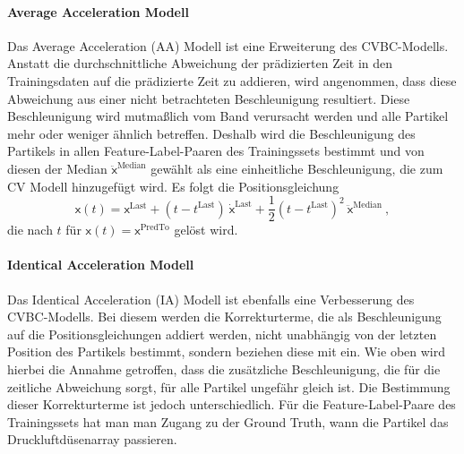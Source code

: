 \paragraph{Average Acceleration Modell}




Das Average Acceleration (AA) Modell ist eine Erweiterung des CVBC-Modells.
Anstatt die durchschnittliche Abweichung der prädizierten Zeit in den Trainingsdaten auf die prädizierte Zeit zu addieren, wird angenommen, 
dass diese Abweichung aus einer nicht betrachteten Beschleunigung resultiert.
Diese Beschleunigung wird mutmaßlich vom Band verursacht werden und alle Partikel mehr oder weniger ähnlich betreffen.
Deshalb wird die Beschleunigung des Partikels in allen Feature-Label-Paaren des Trainingssets bestimmt
und von diesen der Median \(\ddot{ \mathsf{x}}^{\text{Median}}\) gewählt als eine einheitliche Beschleunigung, die zum CV Modell hinzugefügt wird.
Es folgt die Positionsgleichung
\begin{equation*}
    \mathsf{x}(t) =  \mathsf{x}^{\text{Last}} + (t - t^{\text{Last}}) \: \dot{ \mathsf{x}}^{\text{Last}} 
    + \frac{1}{2} (t - t^{\text{Last}})^2 \: \ddot{ \mathsf{x}}^{\text{Median}} \: ,
\end{equation*}
% 
die nach \(t\) für \(\mathsf{x}(t) =  \mathsf{x}^{\text{PredTo}}\) gelöst wird.


\paragraph{Identical Acceleration Modell}


Das Identical Acceleration (IA) Modell ist ebenfalls eine Verbesserung des CVBC-Modells. 
Bei diesem werden die Korrekturterme, die als Beschleunigung auf die Positionsgleichungen addiert werden, nicht unabhängig von der letzten Position des Partikels bestimmt, sondern beziehen diese mit ein.
Wie oben wird hierbei die Annahme getroffen, dass die zusätzliche Beschleunigung, die für die zeitliche Abweichung sorgt, für alle Partikel ungefähr gleich ist.
Die Bestimmung dieser Korrekturterme ist jedoch unterschiedlich.
Für die Feature-Label-Paare des Trainingssets hat man man Zugang zu der Ground Truth, wann die Partikel das Druckluftdüsenarray passieren.

